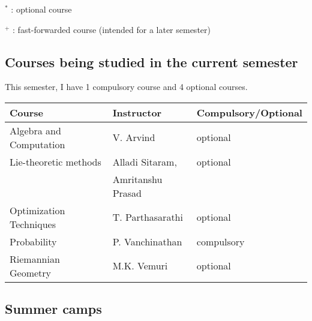 \documentclass[12pt,a4paper,oneside]{amsart}
\begin{document}
\vspace{0.25in}

$^*$ : optional course

$^+$ : fast-forwarded course (intended for a later semester)

\newpage
\vspace{0.25in}

\subsection{Courses being studied in the current semester}

This semester, I have 1 compulsory course and 4 optional courses.

\vspace{0.25in}

\begin{tabular}{|l|l|l|}
  \hline
  Course & Instructor & Compulsory/Optional \\
  \hline
  Algebra and Computation & V. Arvind & optional\\
  Lie-theoretic methods & Alladi Sitaram, & optional\\
  & Amritanshu Prasad & \\
  Optimization Techniques & T. Parthasarathi & optional\\
  Probability & P. Vanchinathan & compulsory\\
  Riemannian Geometry & M.K. Vemuri & optional\\
  \hline
\end{tabular}

\vspace{0.25in}

\subsection{Summer camps}
\end{document}
